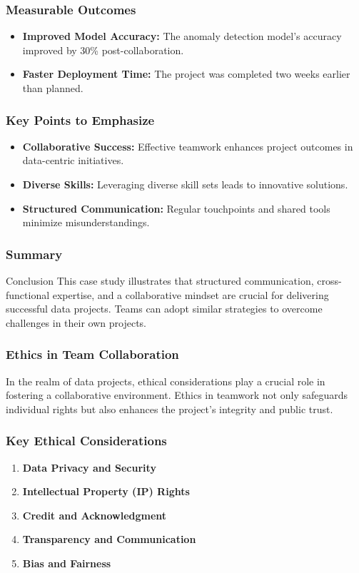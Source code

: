\documentclass[aspectratio=169]{beamer}
\begin{document}
\begin{frame}[fragile]
    \frametitle{Measurable Outcomes}
    \begin{itemize}
        \item \textbf{Improved Model Accuracy:} 
            The anomaly detection model's accuracy improved by 30\% post-collaboration.
        \item \textbf{Faster Deployment Time:} 
            The project was completed two weeks earlier than planned.
    \end{itemize}
\end{frame}

\begin{frame}[fragile]
    \frametitle{Key Points to Emphasize}
    \begin{itemize}
        \item \textbf{Collaborative Success:} Effective teamwork enhances project outcomes in data-centric initiatives.
        \item \textbf{Diverse Skills:} Leveraging diverse skill sets leads to innovative solutions.
        \item \textbf{Structured Communication:} Regular touchpoints and shared tools minimize misunderstandings.
    \end{itemize}
\end{frame}

\begin{frame}[fragile]
    \frametitle{Summary}
    \begin{block}{Conclusion}
        This case study illustrates that structured communication, cross-functional expertise, and a collaborative mindset are crucial for delivering successful data projects. Teams can adopt similar strategies to overcome challenges in their own projects.
    \end{block}
\end{frame}

\begin{frame}[fragile]
    \frametitle{Ethics in Team Collaboration}
    In the realm of data projects, ethical considerations play a crucial role in fostering a collaborative environment. 
    Ethics in teamwork not only safeguards individual rights but also enhances the project's integrity and public trust.
\end{frame}

\begin{frame}[fragile]
    \frametitle{Key Ethical Considerations}
    \begin{enumerate}
        \item \textbf{Data Privacy and Security}
        \item \textbf{Intellectual Property (IP) Rights}
        \item \textbf{Credit and Acknowledgment}
        \item \textbf{Transparency and Communication}
        \item \textbf{Bias and Fairness}
    \end{enumerate}
\end{frame}
\end{document}
